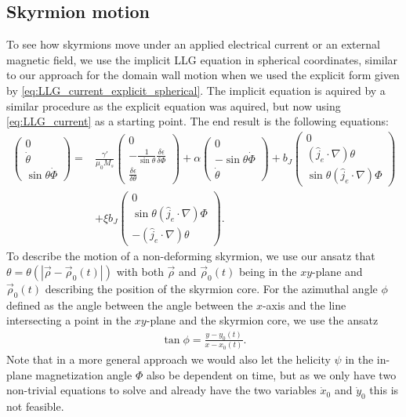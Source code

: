 \documentclass[12pt, a4paper, twoside, openright]{article}		%
\numberwithin{equation}{section}
\begin{document}
\subsection{Skyrmion motion} \label{sec:SkyrmionMotion}
To see how skyrmions move under an applied electrical current or an external magnetic field, we use the implicit LLG equation in spherical coordinates, similar to our approach for the domain wall motion when we used the explicit form given by \eqref{eq:LLG_current_explicit_spherical}. The implicit equation is aquired by a similar procedure as the explicit equation was aquired, but now using \eqref{eq:LLG_current} as a starting point. The end result is the following equations:
\begin{align}
\nonumber \begin{pmatrix}
0 \\ \dot{\theta} \\ \sin\theta\dot{\Phi}
\end{pmatrix} =
&\frac{\gamma'}{\mu_0 M_s}
\begin{pmatrix}
0 \\ -\frac{1}{\sin\theta} \frac{\delta \epsilon}{\delta \Phi} \\ \frac{\delta \epsilon}{\delta \theta}
\end{pmatrix} + \alpha
\begin{pmatrix}
0 \\ -\sin\theta\dot{\Phi} \\ \dot{\theta}
\end{pmatrix} + b_J
\begin{pmatrix}
0 \\ (\hat{j}_e\cdot\nabla)\theta \\ \sin\theta(\hat{j}_e\cdot\nabla)\Phi
\end{pmatrix} \\
&+\xi b_J
\begin{pmatrix}
0 \\ \sin\theta(\hat{j}_e\cdot\nabla)\Phi \\ -(\hat{j}_e\cdot\nabla)\theta
\end{pmatrix}.
\label{eq:LLG_current_implicit_spherical}
\end{align}
To describe the motion of a non-deforming skyrmion, we use our ansatz that\\ $\theta = \theta(|\vec{\rho}-\vec{\rho}_0(t)|)$ with both $\vec{\rho}$ and $\vec{\rho}_0(t)$ being in the $xy$-plane and $\vec{\rho}_0(t)$ describing the position of the skyrmion core. For the azimuthal angle $\phi$ defined as the angle between the angle between the $x$-axis and the line intersecting a point in the $xy$-plane and the skyrmion core, we use the ansatz
\begin{align}
\tan\phi = \frac{y-y_0(t)}{x-x_0(t)}.
\end{align}
Note that in a more general approach we would also let the helicity $\psi$ in the in-plane magnetization angle $\Phi$ also be dependent on time, but as we only have two non-trivial equations to solve and already have the two variables $\dot{x}_0$ and $\dot{y}_0$ this is not feasible.
\end{document}

